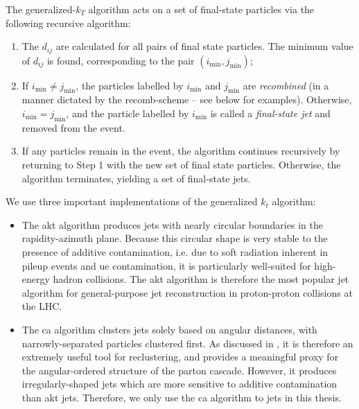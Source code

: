 \begin{subappendices}
\begin{definitionbox}
    The generalized-\(k_T\) algorithm acts on a set of final-state particles via the following recursive algorithm:
    \begin{enumerate}
        \item
            The \(d_{ij}\) are calculated for all pairs of final state particles.
            The minimum value of \(d_{ij}\) is found, corresponding to the pair \((i_\text{min}, j_\text{min})\);

        \item
            If \(i_\text{min} \neq j_\text{min}\), the particles labelled by \(i_\text{min}\) and \(j_\text{min}\) are \textit{recombined} (in a manner dictated by the \gls{recomb-scheme} -- see below for examples).
            Otherwise, \(i_\text{min} = j_\text{min}\), and the particle labelled by \(i_\text{min}\) is called a \textit{final-state \gls{jet}} and removed from the event.

        \item
            If any particles remain in the event, the algorithm continues recursively by returning to Step 1 with the new set of final state particles.
            Otherwise, the algorithm terminates, yielding a set of final-state jets.
    \end{enumerate}
\end{definitionbox}

We use three important implementations of the generalized \(k_t\) algorithm:
\begin{itemize}
    \item

        The \gls{akt} algorithm produces jets with nearly circular boundaries in the rapidity-azimuth plane.
        Because this circular shape is very stable to the presence of additive contamination, i.e. due to soft radiation inherent in \gls{pileup} events and \gls{ue} contamination, it is particularly well-suited for high-energy hadron collisions.
        The \gls{akt} algorithm is therefore the most popular jet algorithm for general-purpose jet reconstruction in proton-proton collisions at the LHC.

    \item

        The \gls{ca} algorithm clusters jets solely based on angular distances, with narrowly-separated particles clustered first.
        As discussed in , it is therefore an extremely useful tool for \gls{reclustering}, and provides a meaningful proxy for the angular-ordered structure of the parton cascade.
        However, it produces irregularly-shaped jets which are more sensitive to additive contamination than \gls{akt} jets.
        Therefore, we only use the \gls{ca} algorithm to  jets in this thesis.



\end{itemize}
\end{subappendices}
